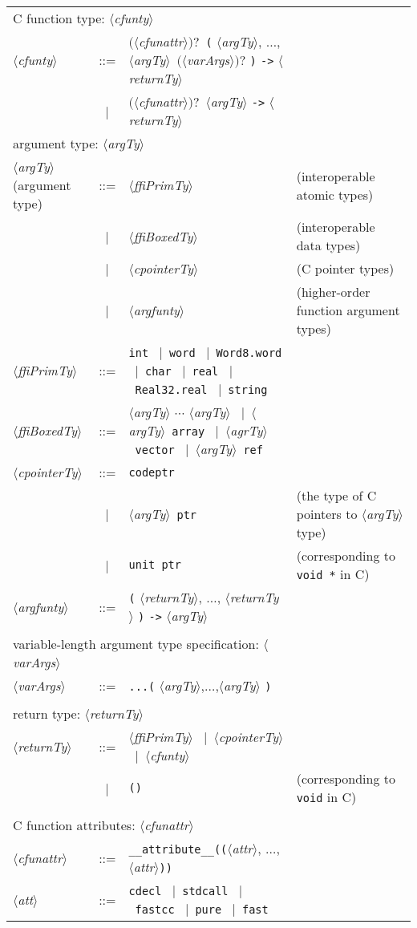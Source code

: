 \documentclass{jbook}
\newcommand{\code}[1]{\mbox{\large\tt #1}}
\newcommand{\vbar}{\mbox{\ $|$\ }}
\newcommand{\nonterm}[1]{\mbox{$\langle$}{\it #1}\mbox{$\rangle$}}
\newcommand{\term}[1]{\mbox{{\tt #1}}}
\newcommand{\optional}[1]{\mbox{$($}{\protect #1}\mbox{$)?$}}
\begin{document}
\begin{center}
\begin{tabular}{lcll}
\multicolumn{3}{l}{C function type: \nonterm{cfunty}}\\
\nonterm{cfunty} &::=& 
   \optional{\nonterm{cfunattr}}\ 
   \term{(} \nonterm{argTy}, $\ldots$, \nonterm{argTy}\
       \optional{\nonterm{varArgs}} \term{)} 
   \term{->} \nonterm{returnTy}\\
&\vbar &    \optional{\nonterm{cfunattr}}\ \nonterm{argTy} \term{->} \nonterm{returnTy}
\\
\multicolumn{3}{l}{argument type: \nonterm{argTy}}
\\
\nonterm{argTy} (argument type) &::=&  
   \nonterm{ffiPrimTy}       & (interoperable atomic types) \\
&\vbar& \nonterm{ffiBoxedTy} & (interoperable data types)\\
&\vbar& \nonterm{cpointerTy} & (C pointer types)\\
&\vbar& \nonterm{argfunty}   & (higher-order function argument types)\\
\nonterm{ffiPrimTy} &::=& 
   \term{int} 
   \vbar \term{word} 
   \vbar \term{Word8.word} 
   \vbar \term{char}
   \vbar \term{real} 
   \vbar \term{Real32.real}
   \vbar \term{string} \\
\nonterm{ffiBoxedTy} &::=&  
  \nonterm{argTy} \term{*} $\cdots$ \term{*} \nonterm{argTy}
  \vbar \nonterm{argTy}\ \term{array}
  \vbar \nonterm{agrTy}\ \term{vector}
  \vbar \nonterm{argTy}\ \term{ref} \\ 
\nonterm{cpointerTy} &::=& \term{codeptr}\\
   &\vbar& \nonterm{argTy}\ \term{ptr}  & (the type of C pointers to \nonterm{argTy} type)\\
    &\vbar& \term{unit\ ptr}            & (corresponding to \code{void *} in C)\\
\nonterm{argfunty} &::=& 
     \term{(} \nonterm{returnTy}, $\ldots$, \nonterm{returnTy} \term{)} \term{->} \nonterm{argTy}\\
\\
\multicolumn{3}{l}{variable-length argument type specification: \nonterm{varArgs}}\\
\nonterm{varArgs} &::=& 
   \term{...(} \nonterm{argTy},$\ldots$,\nonterm{argTy} \term{)}\\
\\
\multicolumn{3}{l}{return type: \nonterm{returnTy}}
\\
\nonterm{returnTy} &::=& 
   \nonterm{ffiPrimTy} 
   \vbar \nonterm{cpointerTy}
   \vbar \nonterm{cfunty}\\
   &\vbar& \term{()}  & (corresponding to \code{void} in C)\\
\\
\multicolumn{3}{l}{C function attributes: \nonterm{cfunattr}}\\
\nonterm{cfunattr}
  &::=& \term{\_\_attribute\_\_((}\nonterm{attr}, $\ldots$, \nonterm{attr}\term{))}\\
\nonterm{att} &::=&
\term{cdecl}
\vbar \term{stdcall}
\vbar \term{fastcc}
\vbar \term{pure}
\vbar \term{fast}
\end{tabular}
\end{center}
\end{document}
